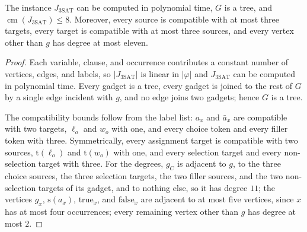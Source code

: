 \documentclass[a4paper,USenglish,thm-restate]{lipics-v2021}
\newcommand{\cm}{\operatorname{cm}}
\newcommand{\src}{\mathrm{s}}
\newcommand{\tgt}{\mathrm{t}}
\theoremstyle{problemstyle}
\begin{document}
\begin{lemma}\label{lem:cm-construction-properties}
The instance $J_{\mathrm{3SAT}}$ can be computed in polynomial time, $G$ is a tree, and
$\cm(J_{\mathrm{3SAT}})\le 8$. Moreover, every source is compatible with at most three
targets, every target is compatible with at most three sources, and every
vertex other than $g$ has degree at most eleven.
\end{lemma}

\begin{proof}
Each variable, clause, and occurrence contributes a constant number of
vertices, edges, and labels, so $|J_{\mathrm{3SAT}}|$ is linear in $|\varphi|$ and $J_{\mathrm{3SAT}}$ can
be computed in polynomial time. Every gadget is a tree, every gadget is
joined to the rest of $G$ by a single edge incident with $g$, and no edge
joins two gadgets; hence $G$ is a tree.

The compatibility bounds follow from the label list: $a_x$ and $\bar a_x$
are compatible with two targets, $\ell_o$ and $w_o$ with one, and every
choice token and every filler token with three. Symmetrically, every
assignment target is compatible with two sources, $\tgt(\ell_o)$ and
$\tgt(w_o)$ with one, and every selection target and every non-selection
target with three. For the degrees, $g_C$ is adjacent to $g$, to the three
choice sources, the three selection targets, the two filler sources, and the
two non-selection targets of its gadget, and to nothing else, so it has
degree $11$; the vertices $g_x$, $\src(a_x)$, $\mathrm{true}_x$, and
$\mathrm{false}_x$ are adjacent to at most five vertices, since $x$ has at
most four occurrences; every remaining vertex other than $g$ has degree at
most $2$.


\end{proof}
\end{document}
